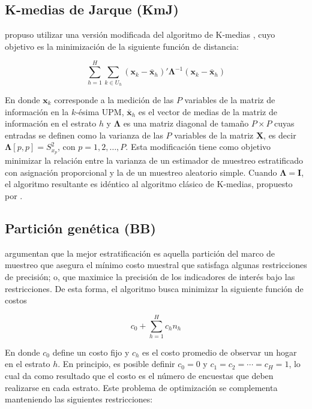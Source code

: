 \documentclass[
  12pt,
  spanish,
]{book}
\begin{document}
\hypertarget{k-medias-de-jarque-kmj}{%
\subsection*{K-medias de Jarque (KmJ)}\label{k-medias-de-jarque-kmj}}

\citet{Jarque_1981} propuso utilizar una versión modificada del algoritmo de K-medias \citep{Macqueen_1967}, cuyo objetivo es la minimización de la siguiente función de distancia:

\[
\sum_{h=1}^H \sum_{k\in U_h}(\mathbf x_k - \bar {\mathbf x}_h)'\boldsymbol \Lambda^{-1}(\mathbf x_k - \bar {\mathbf x}_h)
\]

En donde \(\mathbf x_k\) corresponde a la medición de las \(P\) variables de la matriz de información en la \(k\)-ésima UPM, \(\bar {\mathbf x}_h\) es el vector de medias de la matriz de información en el estrato \(h\) y \(\boldsymbol \Lambda\) es una matriz diagonal de tamaño \(P \times P\) cuyas entradas se definen como la varianza de las \(P\) variables de la matriz \(\mathbf X\), es decir \(\boldsymbol \Lambda [p,p]=S^2_{x_p}\), con \(p = 1, 2, \ldots, P\). Esta modificación tiene como objetivo minimizar la relación entre la varianza de un estimador de muestreo estratificado con asignación proporcional y la de un muestreo aleatorio simple. Cuando \(\boldsymbol \Lambda = \mathbf I\), el algoritmo resultante es idéntico al algoritmo clásico de K-medias, propuesto por \citet{Macqueen_1967}.

\hypertarget{particiuxf3n-genuxe9tica-bb}{%
\subsection*{Partición genética (BB)}\label{particiuxf3n-genuxe9tica-bb}}

\citet{Ballin_Barcaroli_2013} argumentan que la mejor estratificación es aquella partición del marco de muestreo que asegura el mínimo costo muestral que satisfaga algunas restricciones de precisión; o, que maximice la precisión de los indicadores de interés bajo las restricciones. De esta forma, el algoritmo busca minimizar la siguiente función de costos

\[
c_0 + \sum_{h=1}^{H} c_h n_h
\]

En donde \(c_0\) define un costo fijo y \(c_h\) es el costo promedio de observar un hogar en el estrato \(h\). En principio, es posible definir \(c_0=0\) y \(c_1 = c_2 = \cdots = c_H = 1\), lo cual da como resultado que el costo es el número de encuestas que deben realizarse en cada estrato. Este problema de optimización se complementa manteniendo las siguientes restricciones:
\end{document}
